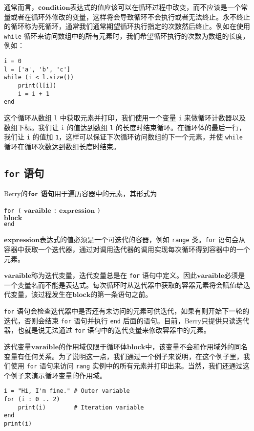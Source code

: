 通常而言，$\bm{condition}$表达式的值应该可以在循环过程中改变，而不应该是一个常量或者在循环外修改的变量，这样将会导致循环不会执行或者无法终止。永不终止的循环称为死循环，通常我们通常期望循环执行指定的次数然后终止。例如在使用 \texttt{while} 循环来访问数组中的所有元素时，我们希望循环执行的次数为数组的长度，例如：
\begin{lstlisting}[language=berry, numbers=none]
i = 0
l = ['a', 'b', 'c']
while (i < l.size())
    print(l[i])
    i = i + 1
end
\end{lstlisting}
这个循环从数组 \texttt{l} 中获取元素并打印，我们使用一个变量 \texttt{i} 来做循环计数器以及数组下标。我们让 \texttt{i} 的值达到数组 \texttt{l} 的长度时结束循环。在循环体的最后一行，我们让 \texttt{i} 的值加 \texttt{1}，这样可以保证下次循环访问数组的下一个元素，并使 \texttt{while} 循环在循环次数达到数组长度时结束。

\subsection{\texttt{for} 语句}

Berry的\textbf{\texttt{for} 语句}用于遍历容器中的元素，其形式为
\begin{algorithm}
    \texttt{for (} $\bm{varaible}$ \texttt{:} $\bm{expression}$ \texttt{)} \\
        \qquad $\bm{block}$ \\
    \texttt{end}
\end{algorithm}\vspace{-0.6em}

$\bm{expression}$表达式的值必须是一个可迭代的容器，例如 \texttt{range} 类。\texttt{for} 语句会从容器中获取一个迭代器，通过对调用迭代器的调用实现每次循环得到容器中的一个元素。

$\bm{varaible}$称为迭代变量，迭代变量总是在 \texttt{for} 语句中定义。因此$\bm{varaible}$必须是一个变量名而不能是表达式。每次循环时从迭代器中获取的容器元素将会赋值给迭代变量，该过程发生在$\bm{block}$的第一条语句之前。

\texttt{for} 语句会检查迭代器中是否还有未访问的元素可供迭代，如果有则开始下一轮的迭代，否则会结束 \texttt{for} 语句并执行 \texttt{end} 后面的语句。目前，Berry只提供只读迭代器，也就是说无法通过 \texttt{for} 语句中的迭代变量来修改容器中的元素。

迭代变量$\bm{varaible}$的作用域仅限于循环体$\bm{block}$中，该变量不会和作用域外的同名变量有任何关系。为了说明这一点，我们通过一个例子来说明，在这个例子里，我们使用 \texttt{for} 语句来访问 \texttt{rang} 实例中的所有元素并打印出来。当然，我们还通过这个例子来演示循环变量的作用域。
\begin{lstlisting}[language=berry]
i = "Hi, I'm fine." # Outer variable
for (i : 0 .. 2)
    print(i)        # Iteration variable
end
print(i)
\end{lstlisting}

